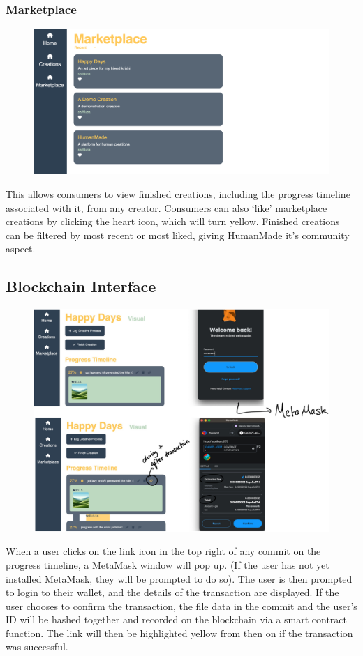 \documentclass[12pt,a4paper]{article}
\begin{document}
\subsubsection{Marketplace}
\begin{figure}[H]
    \centering
    \includegraphics[scale=0.4]{marketplace.png}
\end{figure}
This allows consumers to view finished creations, including the progress timeline associated with it, from any creator. Consumers can also `like' marketplace creations by clicking the heart icon, which will turn yellow. Finished creations can be filtered by most recent or most liked, giving HumanMade it's community aspect.
\subsection{Blockchain Interface}
\begin{figure}[H]
    \centering
    \includegraphics[scale=0.4]{metamask.png}
\end{figure}
When a user clicks on the link icon in the top right of any commit on the progress timeline, a MetaMask window will pop up. (If the user has not yet installed MetaMask, they will be prompted to do so). 
The user is then prompted to login to their wallet, and the details of the transaction are displayed. If the user chooses to confirm the transaction, the file data in the commit and the user's ID will be hashed together and recorded on the blockchain via a smart contract function. The link will then be highlighted yellow from then on if the transaction was successful.
\end{document}
